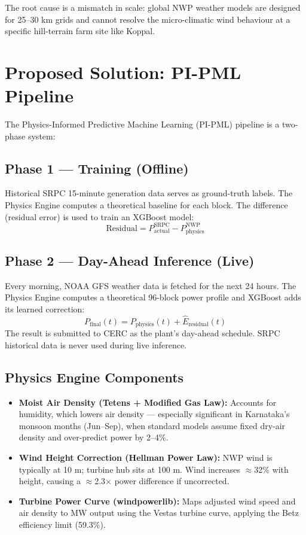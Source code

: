 \documentclass[11pt,a4paper]{article}
\begin{document}
The root cause is a mismatch in scale: global NWP weather models are designed for 25--30 km grids and cannot resolve the micro-climatic wind behaviour at a specific hill-terrain farm site like Koppal.

\section{Proposed Solution: PI-PML Pipeline}

The Physics-Informed Predictive Machine Learning (PI-PML) pipeline is a two-phase system:

\subsection{Phase 1 — Training (Offline)}
Historical SRPC 15-minute generation data serves as ground-truth labels. The Physics Engine computes a theoretical baseline for each block. The difference (residual error) is used to train an XGBoost model:
\[
  \text{Residual} = P_{\text{actual}}^{\text{SRPC}} - P_{\text{physics}}^{\text{NWP}}
\]

\subsection{Phase 2 — Day-Ahead Inference (Live)}
Every morning, NOAA GFS weather data is fetched for the next 24 hours. The Physics Engine computes a theoretical 96-block power profile and XGBoost adds its learned correction:
\[
  P_{\text{final}}(t) = P_{\text{physics}}(t) + \hat{E}_{\text{residual}}(t)
\]
The result is submitted to CERC as the plant's day-ahead schedule. SRPC historical data is never used during live inference.

\subsection{Physics Engine Components}
\begin{itemize}[leftmargin=*, itemsep=3pt]
  \item \textbf{Moist Air Density (Tetens + Modified Gas Law):} Accounts for humidity, which lowers air density --- especially significant in Karnataka's monsoon months (Jun--Sep), when standard models assume fixed dry-air density and over-predict power by 2--4\%.
  \item \textbf{Wind Height Correction (Hellman Power Law):} NWP wind is typically at 10 m; turbine hub sits at 100 m. Wind increases $\approx$32\% with height, causing a $\approx$2.3$\times$ power difference if uncorrected.
  \item \textbf{Turbine Power Curve (windpowerlib):} Maps adjusted wind speed and air density to MW output using the Vestas turbine curve, applying the Betz efficiency limit (59.3\%).
\end{itemize}
\end{document}
